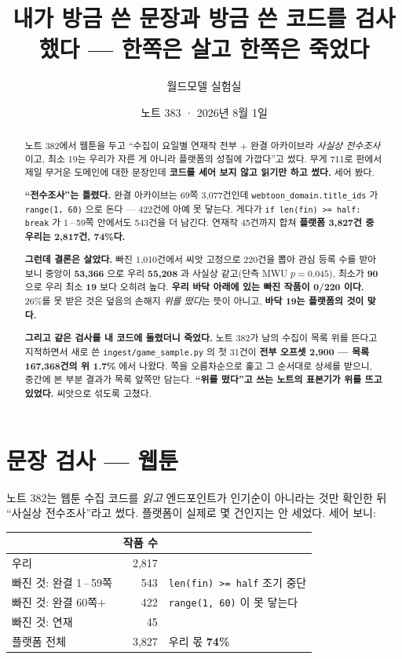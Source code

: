 \documentclass[11pt]{article}
\begin{document}
\title{내가 방금 쓴 문장과 방금 쓴 코드를 검사했다 --- 한쪽은 살고 한쪽은 죽었다}
\author{월드모델 실험실}
\date{노트 383 · 2026년 8월 1일}
\maketitle

\begin{abstract}
노트 382에서 웹툰을 두고 ``수집이 요일별 연재작 전부 $+$ 완결 아카이브라
\emph{사실상 전수조사}이고, 최소 19는 우리가 자른 게 아니라 플랫폼의
성질에 가깝다''고 썼다. 무게 711로 판에서 제일 무거운 도메인에 대한
문장인데 \textbf{코드를 세어 보지 않고 읽기만 하고 썼다.} 세어 봤다.

\textbf{``전수조사''는 틀렸다.} 완결 아카이브는 69쪽 3,077건인데
\texttt{webtoon\_domain.title\_ids} 가 \texttt{range(1, 60)} 으로 돈다 ---
422건에 아예 못 닿는다. 게다가 \texttt{if len(fin) >= half: break} 가
1\,--\,59쪽 안에서도 543건을 더 남긴다. 연재작 45건까지 합쳐
\textbf{플랫폼 3,827건 중 우리는 2,817건, 74\%다.}

\textbf{그런데 결론은 살았다.} 빠진 1,010건에서 씨앗 고정으로 220건을
뽑아 관심 등록 수를 받아 보니 중앙이 \textbf{53,366} 으로 우리
\textbf{55,208} 과 사실상 같고(단측 MWU $p=0.045$), 최소가 \textbf{90} 으로
우리 최소 \textbf{19} 보다 오히려 높다. \textbf{우리 바닥 아래에 있는
빠진 작품이 0/220 이다.} 26\%를 못 받은 것은 덮음의 손해지 \emph{위를
떴다}는 뜻이 아니고, \textbf{바닥 19는 플랫폼의 것이 맞다.}

\textbf{그리고 같은 검사를 내 코드에 돌렸더니 죽었다.} 노트 382가 남의
수집이 목록 위를 뜬다고 지적하면서 새로 쓴
\texttt{ingest/game\_sample.py} 의 첫 31건이 \textbf{전부 오프셋 2,900
--- 목록 167,368건의 위 1.7\%} 에서 나왔다. 쪽을 오름차순으로 훑고 그
순서대로 상세를 받으니, 중간에 본 부분 결과가 목록 앞쪽만 담는다.
\textbf{``위를 떴다''고 쓰는 노트의 표본기가 위를 뜨고 있었다.} 씨앗으로
섞도록 고쳤다.
\end{abstract}

\section{문장 검사 --- 웹툰}

노트 382는 웹툰 수집 코드를 \emph{읽고} 엔드포인트가 인기순이 아니라는
것만 확인한 뒤 ``사실상 전수조사''라고 썼다. 플랫폼이 실제로 몇 건인지는
안 세었다. 세어 보니:

\begin{center}
\begin{tabular}{lrl}
\hline
 & 작품 수 & \\
\hline
우리 & 2,817 & \\
빠진 것: 완결 1\,--\,59쪽 & 543 & \texttt{len(fin) >= half} 조기 중단 \\
빠진 것: 완결 60쪽$+$ & 422 & \texttt{range(1, 60)} 이 못 닿는다 \\
빠진 것: 연재 & 45 & \\
\hline
플랫폼 전체 & 3,827 & 우리 몫 \textbf{74\%} \\
\hline
\end{tabular}
\end{center}
\end{document}
